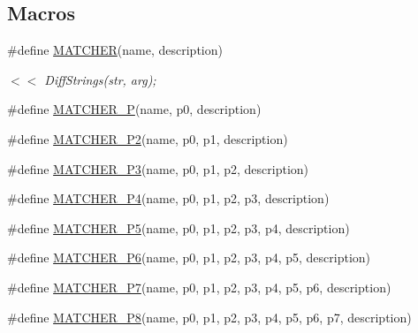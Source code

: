 \subsection*{Macros}
\begin{DoxyCompactItemize}
\item 
\#define \mbox{\hyperlink{googletest-master_2googlemock_2include_2gmock_2gmock-generated-matchers_8h_af4fe73ff8e2b0494f4970b575b65ddff}{M\+A\+T\+C\+H\+ER}}(name,  description)
\begin{DoxyCompactList}\small\item\em $<$$<$ Diff\+Strings(str, arg); \end{DoxyCompactList}\item 
\#define \mbox{\hyperlink{googletest-master_2googlemock_2include_2gmock_2gmock-generated-matchers_8h_acb7ae915efa2fd8d3f6ea7313198afb6}{M\+A\+T\+C\+H\+E\+R\+\_\+P}}(name,  p0,  description)
\item 
\#define \mbox{\hyperlink{googletest-master_2googlemock_2include_2gmock_2gmock-generated-matchers_8h_a78efce3ad21c8f68223f5c2d09f2e79d}{M\+A\+T\+C\+H\+E\+R\+\_\+\+P2}}(name,  p0,  p1,  description)
\item 
\#define \mbox{\hyperlink{googletest-master_2googlemock_2include_2gmock_2gmock-generated-matchers_8h_a507103c6251f8bf4393ec119d9e34d34}{M\+A\+T\+C\+H\+E\+R\+\_\+\+P3}}(name,  p0,  p1,  p2,  description)
\item 
\#define \mbox{\hyperlink{googletest-master_2googlemock_2include_2gmock_2gmock-generated-matchers_8h_a6ec420ed6bc3ad073f19a4e32dd1f38f}{M\+A\+T\+C\+H\+E\+R\+\_\+\+P4}}(name,  p0,  p1,  p2,  p3,  description)
\item 
\#define \mbox{\hyperlink{googletest-master_2googlemock_2include_2gmock_2gmock-generated-matchers_8h_a3a9589cd79e2dbdb4e09981510c9c42e}{M\+A\+T\+C\+H\+E\+R\+\_\+\+P5}}(name,  p0,  p1,  p2,  p3,  p4,  description)
\item 
\#define \mbox{\hyperlink{googletest-master_2googlemock_2include_2gmock_2gmock-generated-matchers_8h_aceda758bb064965b2b9a7e0e96085861}{M\+A\+T\+C\+H\+E\+R\+\_\+\+P6}}(name,  p0,  p1,  p2,  p3,  p4,  p5,  description)
\item 
\#define \mbox{\hyperlink{googletest-master_2googlemock_2include_2gmock_2gmock-generated-matchers_8h_a2948ce54387a83c33fa98ba0c73eb11f}{M\+A\+T\+C\+H\+E\+R\+\_\+\+P7}}(name,  p0,  p1,  p2,  p3,  p4,  p5,  p6,  description)
\item 
\#define \mbox{\hyperlink{googletest-master_2googlemock_2include_2gmock_2gmock-generated-matchers_8h_ad86c95b03df37fada38e18d8eb9e53bc}{M\+A\+T\+C\+H\+E\+R\+\_\+\+P8}}(name,  p0,  p1,  p2,  p3,  p4,  p5,  p6,  p7,  description)

\end{DoxyCompactItemize}
